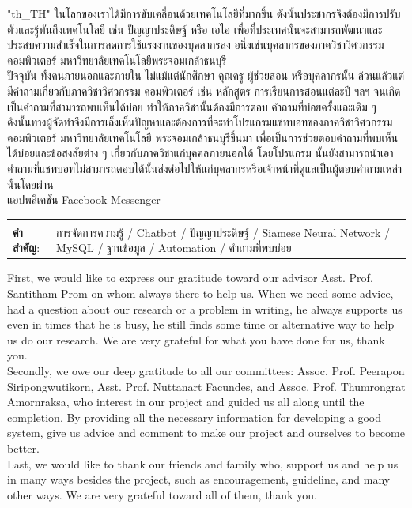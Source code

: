 \documentclass[12pt,oneside,openright,a4paper]{cpe-english-project}
\begin{document}
{
\XeTeXlinebreaklocale "th_TH"	
\thaifont
\thaiabstract
ในโลกของเราได้มีการขับเคลื่อนด้วยเทคโนโลยีที่มากขึ้น ดังนั้นประชากรจึงต้องมีการปรับตัวและรู้ทันถึงเทคโนโลยี เช่น ปัญญาประดิษฐ์ หรือ 
เอไอ เพื่อที่ประเทศนั้นจะสามารถพัฒนาและประสบความสำเร็จในการลดการใช้แรงงานของบุคลากรลง อนึ่งเช่นบุคลากรของภาควิชาวิศวกรรม
คอมพิวเตอร์ มหาวิทยาลัยเทคโนโลยีพระจอมเกล้าธนบุรี\\
ปัจจุบัน ทั้งคนภายนอกและภายใน ไม่แม้แต่นักศึกษา คุณครู ผู้ช่วยสอน หรือบุคลากรนั้น ล้วนแล้วแต่มีคำถามเกี่ยวกับภาควิชาวิศวกรรม
คอมพิวเตอร์ เช่น หลักสูตร การเรียนการสอนแต่ละปี ฯลฯ จนเกิดเป็นคำถามที่สามารถพบเห็นได้บ่อย ทำให้ภาควิชานั้นต้องมีการตอบ
คำถามที่บ่อยครั้งและเดิม ๆ\\
ดังนั้นทางผู้จัดทำจึงมีการเล็งเห็นปัญหาและต้องการที่จะทำโปรแกรมแชทบอทของภาควิชาวิศวกรรมคอมพิวเตอร์ มหาวิทยาลัยเทคโนโลยี
พระจอมเกล้าธนบุรีขึ้นมา เพื่อเป็นการช่วยตอบคำถามที่พบเห็นได้บ่อยและข้อสงสัยต่าง ๆ เกี่ยวกับภาควิชาแก่บุคคลภายนอกได้ โดยโปรแกรม
นั้นยังสามารถนำเอาคำถามที่แชทบอทไม่สามารถตอบได้นั้นส่งต่อไปให้แก่บุคลากรหรือเจ้าหน้าที่ดูแลเป็นผู้ตอบคำถามเหล่านั้นโดยผ่าน
\\แอปพลิเคชัน Facebook Messenger

\begin{flushleft}
\begin{tabular*}{\textwidth}{@{}lp{}}
 & \\

\textbf{คำสำคัญ}: & การจัดการความรู้ / Chatbot / ปัญญาประดิษฐ์ / Siamese Neural Network / MySQL / ฐานข้อมูล / Automation / คำถามที่พบบ่อย
\end{tabular*}
\end{flushleft}
\endabstract
}

\preface
First, we would like to express our gratitude toward our advisor Asst. Prof. Santitham Prom-on whom always 
there to help us. When we need some advice, had a question about our research or a problem in writing, he 
always supports us even in times that he is busy, he still finds some time or alternative way to help us do our 
research. We are very grateful for what you have done for us, thank you.
\\Secondly, we owe our deep gratitude to all our committees: Assoc. Prof. Peerapon Siripongwutikorn, Asst. 
Prof. Nuttanart Facundes, and Assoc. Prof. Thumrongrat Amornraksa, who interest in our project and guided 
us all along until the completion.  By providing all the necessary information for developing a good system, 
give us advice and comment to make our project and ourselves to become better.
\\Last, we would like to thank our friends and family who, support us and help us in many ways besides the 
project, such as encouragement, guideline, and many other ways. We are very grateful toward all of them, 
thank you.
\end{document}
